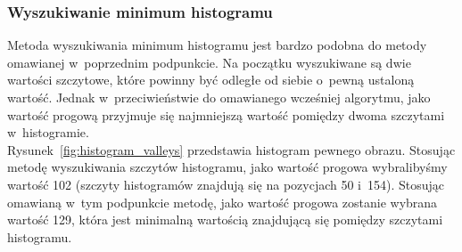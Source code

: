 \subsubsection{Wyszukiwanie minimum histogramu}
Metoda wyszukiwania minimum histogramu jest bardzo podobna do metody omawianej w~poprzednim podpunkcie. Na początku wyszukiwane są dwie wartości szczytowe, które powinny być odległe od siebie o~pewną ustaloną wartość. Jednak w~przeciwieństwie do omawianego wcześniej algorytmu, jako wartość progową przyjmuje się najmniejszą wartość pomiędzy dwoma szczytami w~histogramie. \\
Rysunek~\ref{fig:histogram_valleys} przedstawia histogram pewnego obrazu. Stosując metodę wyszukiwania szczytów histogramu, jako wartość progowa wybralibyśmy wartość 102 (szczyty histogramów znajdują się na pozycjach 50 i~154). Stosując omawianą w~tym podpunkcie metodę, jako wartość progowa zostanie wybrana wartość 129, która jest minimalną wartością znajdującą się pomiędzy szczytami histogramu.

